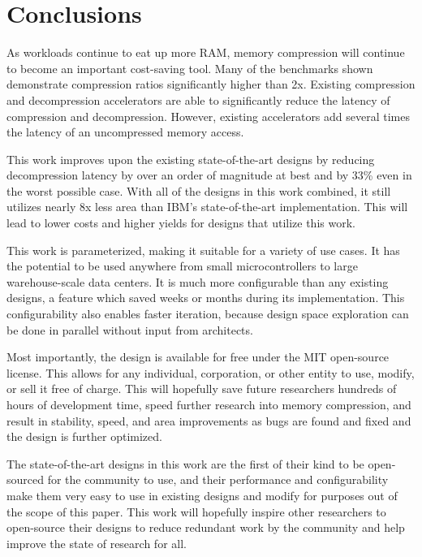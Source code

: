 \documentclass[doublespace,nopageskip]{VTthesis}
\begin{document}
\chapter{Conclusions} \label{ch:conclusions}
As workloads continue to eat up more RAM, memory compression will continue to become an important cost-saving tool. Many of the benchmarks shown demonstrate compression ratios significantly higher than 2x. Existing compression and decompression accelerators are able to significantly reduce the latency of compression and decompression. However, existing accelerators add several times the latency of an uncompressed memory access.

This work improves upon the existing state-of-the-art designs by reducing decompression latency by over an order of magnitude at best and by 33\% even in the worst possible case. With all of the designs in this work combined, it still utilizes nearly 8x less area than IBM's state-of-the-art implementation. This will lead to lower costs and higher yields for designs that utilize this work.

This work is parameterized, making it suitable for a variety of use cases. It has the potential to be used anywhere from small microcontrollers to large warehouse-scale data centers. It is much more configurable than any existing designs, a feature which saved weeks or months during its implementation. This configurability also enables faster iteration, because design space exploration can be done in parallel without input from architects.

Most importantly, the design is available for free under the MIT open-source license. This allows for any individual, corporation, or other entity to use, modify, or sell it free of charge. This will hopefully save future researchers hundreds of hours of development time, speed further research into memory compression, and result in stability, speed, and area improvements as bugs are found and fixed and the design is further optimized.

The state-of-the-art designs in this work are the first of their kind to be open-sourced for the community to use, and their performance and configurability make them very easy to use in existing designs and modify for purposes out of the scope of this paper. This work will hopefully inspire other researchers to open-source their designs to reduce redundant work by the community and help improve the state of research for all.


   
\end{document}
